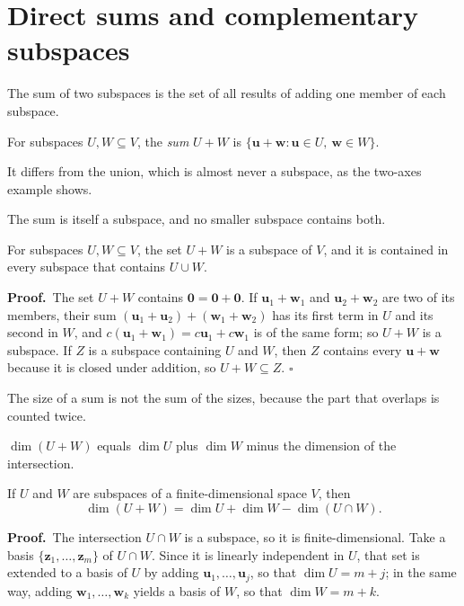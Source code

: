 \section{Direct sums and complementary subspaces}

The sum of two subspaces is the set of all results of adding one member of each subspace.

\begin{definisi}
For subspaces $U,W\subseteq V$, the \emph{sum} $U+W$ is
$\{\mathbf{u}+\mathbf{w}:\mathbf{u}\in U,\ \mathbf{w}\in W\}$.
\end{definisi}

It differs from the union, which is almost never a subspace, as the two-axes example shows.

The sum is itself a subspace, and no smaller subspace contains both.

\begin{proposisi}
For subspaces $U,W\subseteq V$, the set $U+W$ is a subspace of $V$, and it is contained in every
subspace that contains $U\cup W$.
\end{proposisi}

\par\medskip\noindent\textbf{Proof.}\ 
The set $U+W$ contains $\mathbf{0}=\mathbf{0}+\mathbf{0}$. If
$\mathbf{u}_{1}+\mathbf{w}_{1}$ and $\mathbf{u}_{2}+\mathbf{w}_{2}$ are two of its members, their
sum $(\mathbf{u}_{1}+\mathbf{u}_{2})+(\mathbf{w}_{1}+\mathbf{w}_{2})$ has its first term in $U$
and its second in $W$, and $c(\mathbf{u}_{1}+\mathbf{w}_{1})=c\mathbf{u}_{1}+c\mathbf{w}_{1}$ is
of the same form; so $U+W$ is a subspace. If $Z$ is a subspace containing $U$ and $W$, then $Z$
contains every $\mathbf{u}+\mathbf{w}$ because it is closed under addition, so $U+W\subseteq Z$.
\hfill$\square$\par\medskip

The size of a sum is not the sum of the sizes, because the part that overlaps is counted twice.

$\dim(U+W)$ equals $\dim U$ plus $\dim W$ minus the dimension of the intersection.

\begin{teorema}
If $U$ and $W$ are subspaces of a finite-dimensional space $V$, then
\[
  \dim(U+W)=\dim U+\dim W-\dim(U\cap W).
\]
\end{teorema}

\par\medskip\noindent\textbf{Proof.}\ 
The intersection $U\cap W$ is a subspace, so it is finite-dimensional. Take a basis
$\{\mathbf{z}_{1},\dots,\mathbf{z}_{m}\}$ of $U\cap W$. Since it is linearly independent in $U$,
that set is extended to a basis of $U$ by adding $\mathbf{u}_{1},\dots,
\mathbf{u}_{j}$, so that $\dim U=m+j$; in the same way, adding
$\mathbf{w}_{1},\dots,\mathbf{w}_{k}$ yields a basis of $W$, so that $\dim W=m+k$.

